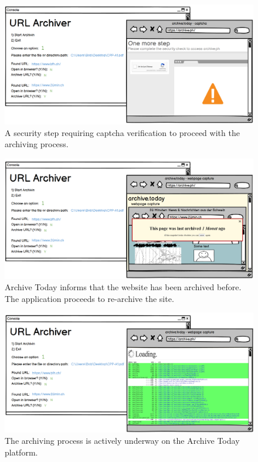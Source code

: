 \begin{figure}[h!]
    \centering
    \includegraphics[width=1\textwidth]{pictures/UX-Prototype/Prototype_4}
    \caption{A security step requiring captcha verification to proceed with the archiving process.}
    \label{fig:Archiving_Decision}
\end{figure}
\begin{figure}[h!]
    \centering
    \includegraphics[width=1\textwidth]{pictures/UX-Prototype/Prototype_5}
    \caption{Archive Today informs that the website has been archived before. The application proceeds to re-archive the site.}
    \label{fig:Captcha_Verification}
\end{figure}
\begin{figure}[h!]
    \centering
    \includegraphics[width=1\textwidth]{pictures/UX-Prototype/Prototype_6}
    \caption{The archiving process is actively underway on the Archive Today platform.}
    \label{fig:Archiving_Confirmation}
\end{figure}
